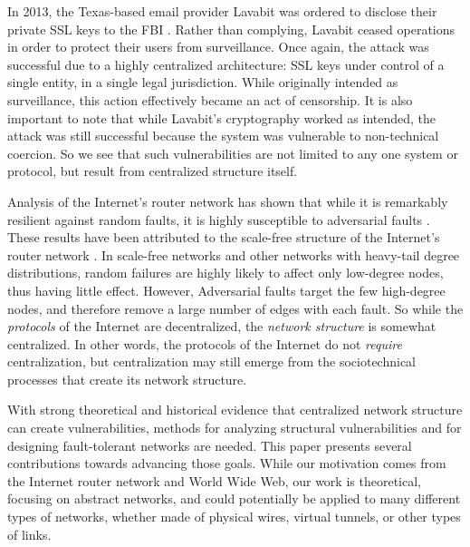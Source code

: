 \documentclass[twocolumn]{article}
\begin{document}
In 2013, the Texas-based email provider Lavabit was ordered to disclose
their private SSL keys to the FBI \cite{poulsen_edward_2013}.
Rather than complying,
Lavabit ceased operations
in order to protect their users from surveillance.
Once again, the attack was successful due to a highly centralized
architecture:
SSL keys under control of a single entity, in a single legal jurisdiction.
While originally intended as surveillance,
this action effectively became an act of censorship.
It is also important to note that while Lavabit's cryptography worked as intended,
the attack was still successful because the system was
vulnerable to non-technical coercion.
So we see that such vulnerabilities are not limited to any one system or protocol,
but result from centralized structure itself.

Analysis of the Internet's router network has shown that while it
is remarkably resilient against random faults,
it is highly susceptible to adversarial faults \cite{albert_error_2000}.
These results have been attributed to the scale-free structure of the Internet's
router network
\cite{barabasi_emergence_1999,barabasi_scale-free_2009}.
In scale-free networks and other networks with heavy-tail degree distributions,
random failures are highly likely to
affect only low-degree nodes, thus having
little effect.
However, Adversarial faults target the few high-degree nodes,
and therefore remove a large number of edges with each fault.
So while the {\em protocols} of the Internet are decentralized,
the {\em network structure} is somewhat centralized. 
In other words, the protocols of the Internet do not {\em require}
centralization, but centralization may still emerge from the sociotechnical
processes that create its network structure.

With strong theoretical and historical evidence that centralized
network structure can create vulnerabilities,
methods for analyzing structural vulnerabilities and for designing
fault-tolerant networks are needed.
This paper presents several contributions towards advancing those goals.
While our motivation comes from the Internet router network and
World Wide Web,
our work is theoretical, focusing on abstract networks,
and could potentially be applied to many different types of networks,
whether made of physical wires, virtual tunnels,
or other types of links.
\end{document}
